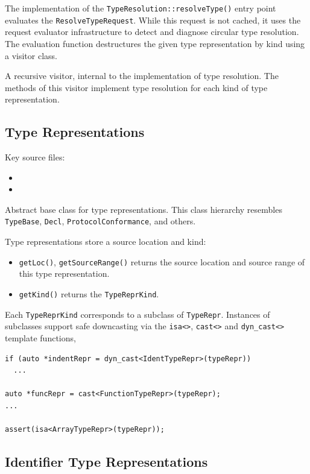 \documentclass[../generics]{subfiles}
\begin{document}
The implementation of the \texttt{TypeResolution::resolveType()} entry point evaluates the \texttt{ResolveTypeRequest}. While this request is not cached, it uses the request evaluator infrastructure to detect and diagnose circular type resolution. The evaluation function destructures the given type representation by kind using a visitor class.

A recursive visitor, internal to the implementation of type resolution. The methods of this visitor implement type resolution for each kind of type representation.

\subsection*{Type Representations}

Key source files:
\begin{itemize}
\item {}
\item {}
\end{itemize}

Abstract base class for type representations. This class hierarchy resembles \texttt{TypeBase}, \texttt{Decl}, \texttt{ProtocolConformance}, and others.

Type representations store a source location and kind:
\begin{itemize}
\item \texttt{getLoc()}, \texttt{getSourceRange()} returns the source location and source range of this type representation.
\item \texttt{getKind()} returns the \texttt{TypeReprKind}.
\end{itemize}
Each \texttt{TypeReprKind} corresponds to a subclass of \texttt{TypeRepr}. Instances of subclasses support safe downcasting via the \verb|isa<>|, \verb|cast<>| and \verb|dyn_cast<>| template functions,
\begin{Verbatim}
if (auto *indentRepr = dyn_cast<IdentTypeRepr>(typeRepr))
  ...

auto *funcRepr = cast<FunctionTypeRepr>(typeRepr);
...

assert(isa<ArrayTypeRepr>(typeRepr));
\end{Verbatim}

\subsection*{Identifier Type Representations}
\end{document}
